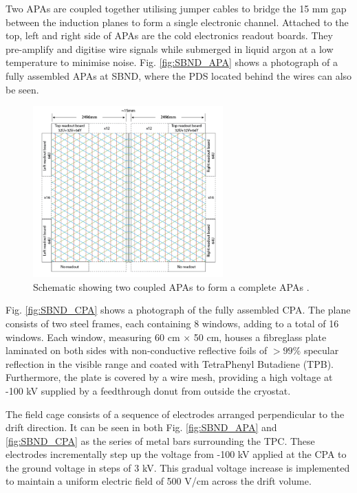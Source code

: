 Two APAs are coupled together utilising jumper cables to bridge the 15 mm gap between the induction planes to form a single electronic channel. 
Attached to the top, left and right side of APAs are the cold electronics readout boards.
They pre-amplify and digitise wire signals while submerged in liquid argon at a low temperature to minimise noise. 
Fig. \ref{fig:SBND_APA} shows a photograph of a fully assembled APAs at SBND, where the PDS located behind the wires can also be seen.  

\begin{figure}[hb!] 
\centering    
\includegraphics[width=0.65\textwidth]{SBND_APA}
\caption[Anode Plane Assemblies Schematic]{
Schematic showing two coupled APAs to form a complete APAs \cite{SBNProposal}.
}
\label{fig:SBND_APA_diag}
\end{figure}

Fig. \ref{fig:SBND_CPA} shows a photograph of the fully assembled CPA.                                                                                                                                 
The plane consists of two steel frames, each containing 8 windows, adding to a total of 16 windows.
Each window, measuring 60 cm $\times$ 50 cm, houses a fibreglass plate laminated on both sides with non-conductive reflective foils of $> 99\%$ specular reflection in the visible range and coated with TetraPhenyl Butadiene (TPB).
Furthermore, the plate is covered by a wire mesh, providing a high voltage at -100 kV supplied by a feedthrough donut from outside the cryostat.

The field cage consists of a sequence of electrodes arranged perpendicular to the drift direction.
It can be seen in both Fig. \ref{fig:SBND_APA} and \ref{fig:SBND_CPA} as the series of metal bars surrounding the TPC.
These electrodes incrementally step up the voltage from -100 kV applied at the CPA to the ground voltage in steps of 3 kV. 
This gradual voltage increase is implemented to maintain a uniform electric field of 500 V/cm across the drift volume.

